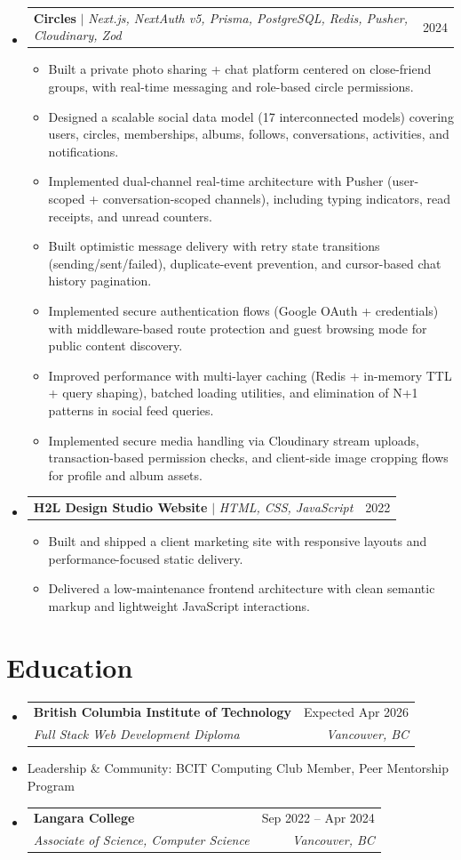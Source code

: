 \documentclass[a4paper,10pt]{article}
\makeatletter
\newcommand{\resumeItem}[1]{%
  \item\small{#1\vspace{-1pt}}%
}
\newcommand{\resumeSubheading}[4]{%
  \vspace{1pt}\item
  \begin{tabular*}{0.97\textwidth}[t]{l@{\extracolsep{\fill}}r}
    \textbf{#1} & #2 \\
    \textit{\small #3} & \textit{\small #4} \\
  \end{tabular*}\vspace{-6pt}%
}
\newcommand{\resumeProjectHeading}[2]{%
  \item
  \begin{tabular*}{0.97\textwidth}{l@{\extracolsep{\fill}}r}
    \small #1 & #2 \\
  \end{tabular*}\vspace{-6pt}%
}
\newcommand{\resumeItemListStart}{\begin{itemize}[itemsep=2pt]}
\newcommand{\resumeItemListEnd}{\end{itemize}\vspace{-2pt}}
\makeatother
\begin{document}
\begin{itemize}[leftmargin=0.15in, label={}]
  \resumeProjectHeading
    {\textbf{Circles} $|$ \emph{Next.js, NextAuth v5, Prisma, PostgreSQL, Redis, Pusher, Cloudinary, Zod}}{2024}
  \resumeItemListStart
    \resumeItem{Built a private photo sharing + chat platform centered on close-friend groups, with real-time messaging and role-based circle permissions.}
    \resumeItem{Designed a scalable social data model (17 interconnected models) covering users, circles, memberships, albums, follows, conversations, activities, and notifications.}
    \resumeItem{Implemented dual-channel real-time architecture with Pusher (user-scoped + conversation-scoped channels), including typing indicators, read receipts, and unread counters.}
    \resumeItem{Built optimistic message delivery with retry state transitions (sending/sent/failed), duplicate-event prevention, and cursor-based chat history pagination.}
    \resumeItem{Implemented secure authentication flows (Google OAuth + credentials) with middleware-based route protection and guest browsing mode for public content discovery.}
    \resumeItem{Improved performance with multi-layer caching (Redis + in-memory TTL + query shaping), batched loading utilities, and elimination of N+1 patterns in social feed queries.}
    \resumeItem{Implemented secure media handling via Cloudinary stream uploads, transaction-based permission checks, and client-side image cropping flows for profile and album assets.}
  \resumeItemListEnd

  \resumeProjectHeading
    {\textbf{H2L Design Studio Website} $|$ \emph{HTML, CSS, JavaScript}}{2022}
  \resumeItemListStart
    \resumeItem{Built and shipped a client marketing site with responsive layouts and performance-focused static delivery.}
    \resumeItem{Delivered a low-maintenance frontend architecture with clean semantic markup and lightweight JavaScript interactions.}
  \resumeItemListEnd

\end{itemize}

\section{Education}
\begin{itemize}[leftmargin=0.15in, label={}]
  \resumeSubheading
    {British Columbia Institute of Technology}{Expected Apr 2026}
    {Full Stack Web Development Diploma}{Vancouver, BC}
  \resumeItem{Leadership \& Community: BCIT Computing Club Member, Peer Mentorship Program}

  \resumeSubheading
    {Langara College}{Sep 2022 -- Apr 2024}
    {Associate of Science, Computer Science}{Vancouver, BC}
\end{itemize}
\end{document}
